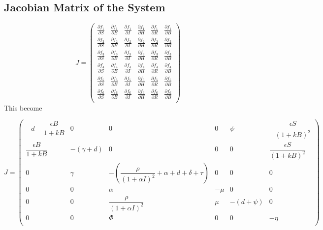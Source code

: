 \documentclass[a4paper,12pt]{report}
\begin{document}
\begin{itemize}
\section*{Jacobian Matrix of the System}

\[
J =
\begin{pmatrix}
\frac{\partial f_1}{\partial S} & \frac{\partial f_1}{\partial E} & \frac{\partial f_1}{\partial I} & \frac{\partial f_1}{\partial H} & \frac{\partial f_1}{\partial R} & \frac{\partial f_1}{\partial B} \\
\frac{\partial f_2}{\partial S} & \frac{\partial f_2}{\partial E} & \frac{\partial f_2}{\partial I} & \frac{\partial f_2}{\partial H} & \frac{\partial f_2}{\partial R} & \frac{\partial f_2}{\partial B} \\
\frac{\partial f_3}{\partial S} & \frac{\partial f_3}{\partial E} & \frac{\partial f_3}{\partial I} & \frac{\partial f_3}{\partial H} & \frac{\partial f_3}{\partial R} & \frac{\partial f_3}{\partial B} \\
\frac{\partial f_4}{\partial S} & \frac{\partial f_4}{\partial E} & \frac{\partial f_4}{\partial I} & \frac{\partial f_4}{\partial H} & \frac{\partial f_4}{\partial R} & \frac{\partial f_4}{\partial B} \\
\frac{\partial f_5}{\partial S} & \frac{\partial f_5}{\partial E} & \frac{\partial f_5}{\partial I} & \frac{\partial f_5}{\partial H} & \frac{\partial f_5}{\partial R} & \frac{\partial f_5}{\partial B} \\
\frac{\partial f_6}{\partial S} & \frac{\partial f_6}{\partial E} & \frac{\partial f_6}{\partial I} & \frac{\partial f_6}{\partial H} & \frac{\partial f_6}{\partial R} & \frac{\partial f_6}{\partial B} \\
\end{pmatrix}
\]
This become 


\[
J =
\begin{pmatrix}
- d - \dfrac{\epsilon B}{1 + kB} & 0 & 0 & 0 & \psi & - \dfrac{\epsilon S}{(1 + kB)^2} \\
\dfrac{\epsilon B}{1 + kB} & -(\gamma + d) & 0 & 0 & 0 & \dfrac{\epsilon S}{(1 + kB)^2} \\
0 & \gamma & - \left( \dfrac{\rho}{(1 + \alpha I)^2} + \alpha + d + \delta + \tau \right) & 0 & 0 & 0 \\
0 & 0 & \alpha & -\mu & 0 & 0 \\
0 & 0 & \dfrac{\rho}{(1 + \alpha I)^2} & \mu & - (d + \psi) & 0 \\
0 & 0 & \Phi & 0 & 0 & -\eta \\
\end{pmatrix}
\]


\end{itemize}
\end{document}
